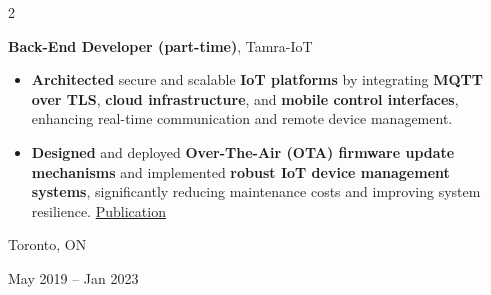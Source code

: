 \documentclass[10pt, letterpaper]{article}
\newenvironment{highlights}{
    \begin{itemize}[
        topsep=0.10 cm,
        parsep=0.10 cm,
        partopsep=0pt,
        itemsep=0pt,
        leftmargin=0.4 cm + 10pt
    ]
}{
    \end{itemize}
} %
\newenvironment{twocolentry}[2][]{
    \onecolentry
    \def\secondColumn{#2}
    \setcolumnwidth{\fill, 4.5 cm}
    \begin{paracol}{2}
}{
    \switchcolumn \raggedleft \secondColumn
    \end{paracol}
    \endonecolentry
} %
\let\hrefWithoutArrow\href
\renewcommand{\href}[2]{\hrefWithoutArrow{#1}{#2}}
\begin{document}

     \vspace{0.1 cm}
\begin{twocolentry}{
            Toronto, ON

        May 2019 – Jan 2023
        }
            \textbf{Back-End Developer (part-time)}, Tamra-IoT
      \begin{highlights}
    \item \textbf{Architected} secure and scalable \textbf{IoT platforms} by integrating \textbf{MQTT over TLS}, \textbf{cloud infrastructure}, and \textbf{mobile control interfaces}, enhancing real-time communication and remote device management.

    \item \textbf{Designed} and deployed \textbf{Over-The-Air (OTA) firmware update mechanisms} and implemented \textbf{robust IoT device management systems}, significantly reducing maintenance costs and improving system resilience. \href{https://ieeexplore.ieee.org/abstract/document/9824989}{Publication}
\end{highlights}

        \end{twocolentry}
\end{document}
